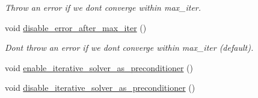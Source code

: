 \begin{DoxyCompactItemize}
\begin{DoxyCompactList}\small\item\em Throw an error if we don\textquotesingle{}t converge within max\+\_\+iter. \end{DoxyCompactList}\item 
void \hyperlink{classoomph_1_1IterativeLinearSolver_a4b6ee927fcefefee7271798a6ed6f5af}{disable\+\_\+error\+\_\+after\+\_\+max\+\_\+iter} ()
\begin{DoxyCompactList}\small\item\em Don\textquotesingle{}t throw an error if we don\textquotesingle{}t converge within max\+\_\+iter (default). \end{DoxyCompactList}\item 
void \hyperlink{classoomph_1_1IterativeLinearSolver_a5992bf9fde252add8d3be2970093905b}{enable\+\_\+iterative\+\_\+solver\+\_\+as\+\_\+preconditioner} ()
\item 
void \hyperlink{classoomph_1_1IterativeLinearSolver_a96b5e3f30fd7bdc9b52a22cdac02a570}{disable\+\_\+iterative\+\_\+solver\+\_\+as\+\_\+preconditioner} ()
\end{DoxyCompactItemize}
